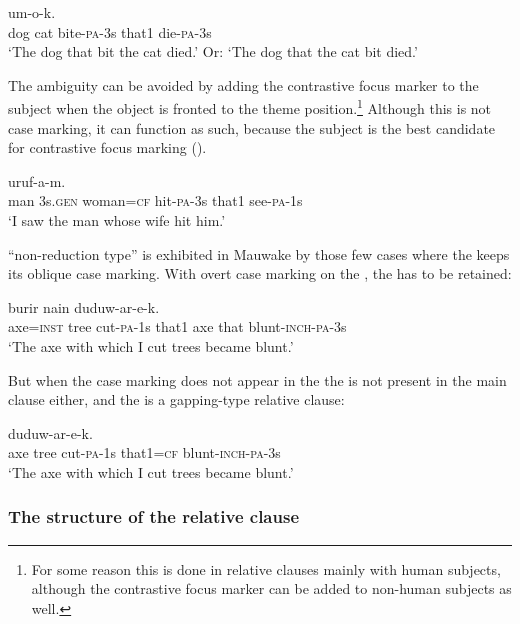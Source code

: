 \ea%
\label{ex:x1548}
  um-o-k. \\
dog  cat  bite-\textsc{pa}-3s that1 die-\textsc{pa}-3s\\
\glt`The dog that bit the cat died.' Or: `The dog that the cat bit died.'
\z


The ambiguity can be avoided by adding the contrastive focus marker to the subject when the object is fronted to the theme position.\footnote{For some reason this is done in relative clauses mainly with human subjects, although the contrastive focus marker can be added to non-human subjects as well.}  Although this is not case marking, it can function as such, because the subject is the best candidate for contrastive focus marking ().

\ea%
\label{ex:x1549}
\gll [Mua  ona  emeria=ke  aruf-a-k  nain]  uruf-a-m. \\
man  3s.\textsc{gen} woman=\textsc{cf} hit-\textsc{pa}-3s that1 see-\textsc{pa}-1s\\
\glt`I saw the man whose wife hit him.'
\z


 ``non-reduction type'' is exhibited in Mauwake by those few cases where the  keeps its oblique case marking. With overt case marking on the , the  has to be retained:

\ea%
\label{ex:x1544}
\gll [\textbf{Burir=iw}  nomokowa  war-em  nain,]  burir  nain  duduw-ar-e-k.\\
axe=\textsc{inst} tree cut-\textsc{pa}-1s that1 axe that blunt-\textsc{inch}-\textsc{pa}-3s\\
\glt`The axe with which I cut trees became blunt.'
\z
{}


But when the case marking does not appear in the  the  is not present in the main clause either, and the  is a gapping-type relative clause:

\ea%
\label{ex:x1541}
\gll [\textbf{Burir}  nomokowa  war-e-m  nain=ke]  duduw-ar-e-k. \\
axe  tree  cut-\textsc{pa}-1s that1=\textsc{cf} blunt-\textsc{inch}-\textsc{pa}-3s\\
\glt`The axe with which I cut trees became blunt.'
\z


\subsubsection[The structure of the relative clause ]{The structure of the relative clause} 


